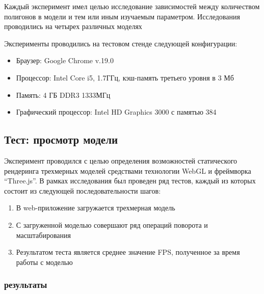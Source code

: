 \documentclass[14pt, a4paper]{extarticle}
\begin{document}
Каждый эксперимент имел целью исследование зависимостей между количеством
полигонов в модели и тем или иным изучаемым параметром. Исследования проводились
на четырех различных моделях

\begin{center}
\end{center}

Эксперименты проводились на тестовом стенде следующей конфигурации:
\begin{itemize}
    \item Браузер: Google Chrome v.19.0
    \item Процессор: Intel Core i5, 1.7ГГц, кэш-память третьего уровня в 3 Мб
    \item Память: 4 ГБ DDR3 1333МГц
    \item Графический процессор: Intel HD Graphics 3000 с памятью 384
\end{itemize}

\subsection{Тест: просмотр модели}

Эксперимент проводился с целью определения возможностей статического
рендеринга трехмерных моделей средствами технологии WebGL и фреймворка
``Three.js''. В рамках исследования был проведен ряд тестов, каждый из которых
состоит из следующей последовательности шагов:
\begin{enumerate}
    \item В web-приложение загружается трехмерная модель
    \item С загруженной моделью совершают ряд операций поворота
    и масштабирования
    \item Результатом теста является среднее значение FPS, полученное
    за время работы с моделью
\end{enumerate}

\subsubsection{результаты}
\begin{center}
\end{center}
\end{document}
